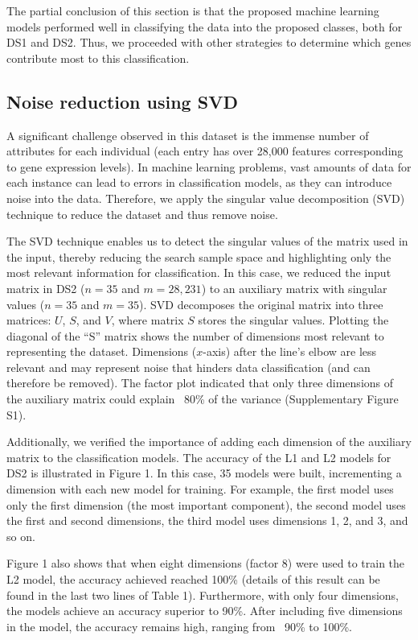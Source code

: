 The partial conclusion of this section is that the proposed machine learning models performed well in classifying the data into the proposed classes, both for DS1 and DS2. Thus, we proceeded with other strategies to determine which genes contribute most to this classification.

\subsection{Noise reduction using SVD} %

A significant challenge observed in this dataset is the immense number of attributes for each individual (each entry has over 28,000 features corresponding to gene expression levels). In machine learning problems, vast amounts of data for each instance can lead to errors in classification models, as they can introduce noise into the data. Therefore, we apply the singular value decomposition (SVD) technique to reduce the dataset and thus remove noise.

The SVD technique enables us to detect the singular values of the matrix used in the input, thereby reducing the search sample space and highlighting only the most relevant information for classification. In this case, we reduced the input matrix in DS2 ($n = 35$ and $m = 28,231$) to an auxiliary matrix with singular values ($n = 35$ and $m = 35$). SVD decomposes the original matrix into three matrices: $U$, $S$, and $V$, where matrix $S$ stores the singular values. Plotting the diagonal of the ``S'' matrix shows the number of dimensions most relevant to representing the dataset. Dimensions ($x$-axis) after the line's elbow are less relevant and may represent noise that hinders data classification (and can therefore be removed). The factor plot indicated that only three dimensions of the auxiliary matrix could explain ~80\% of the variance (Supplementary Figure S1).

Additionally, we verified the importance of adding each dimension of the auxiliary matrix to the classification models. The accuracy of the L1 and L2 models for DS2 is illustrated in Figure 1. In this case, 35 models were built, incrementing a dimension with each new model for training. For example, the first model uses only the first dimension (the most important component), the second model uses the first and second dimensions, the third model uses dimensions 1, 2, and 3, and so on.

Figure 1 also shows that when eight dimensions (factor 8) were used to train the L2 model, the accuracy achieved reached 100\% (details of this result can be found in the last two lines of Table 1). Furthermore, with only four dimensions, the models achieve an accuracy superior to 90\%. After including five dimensions in the model, the accuracy remains high, ranging from ~90\% to 100\%.

